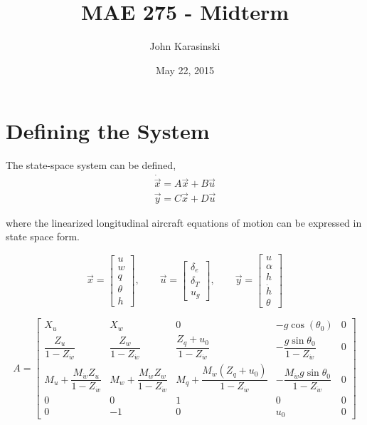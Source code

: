 \documentclass[11pt]{article}
\title{MAE 275 - Midterm}
\author{John Karasinski}
\date{May 22, 2015}
\begin{document}
\maketitle

\section{Defining the System}
The state-space system can be defined,
\begin{equation*}
\begin{split}
\dot{\vec{x}} = A\vec{x} + B\vec{u} \\
      \vec{y} = C\vec{x} + D\vec{u}
\end{split}
\end{equation*}

\noindent where the linearized longitudinal aircraft equations of motion can be expressed in state space form.

$$
\vec{x}= \left[ \begin{array}{c}        u \\ w        \\ q   \\ \theta \\       h \end{array} \right], \qquad
\vec{u}= \left[ \begin{array}{c} \delta_e \\ \delta_T \\ u_g                      \end{array} \right], \qquad
\vec{y}= \left[ \begin{array}{c}        u \\ \alpha   \\ h   \\ \dot{h} \\ \theta \end{array} \right] 
$$

\begin{equation*}
A =
\begin{bmatrix}
    X_u & X_w & 0 & -g \cos(\theta_0) & 0 \\
    \dfrac{Z_u}{1-Z_{\dot{w}}} & \dfrac{Z_w}{1-Z_{\dot{w}}} & \dfrac{Z_q + u_0}{1-Z_{\dot{w}}} & -\dfrac{g\sin \theta_0}{1-Z_{\dot{w}}} & 0 \\
    M_u + \dfrac{M_{\dot{w}} Z_u}{1-Z_{\dot{w}}} & M_w + \dfrac{M_{\dot{w}} Z_w}{1-Z_{\dot{w}}} & M_q + \dfrac{M_{\dot{w}} (Z_q + u_0)}{1-Z_{\dot{w}}} & -\dfrac{M_{\dot{w}} g\sin \theta_0}{1-Z_{\dot{w}}} & 0 \\
    0 & 0 & 1 & 0 & 0 \\
    0 & -1 & 0 & u_0 & 0
\end{bmatrix}
\end{equation*}
\end{document}
